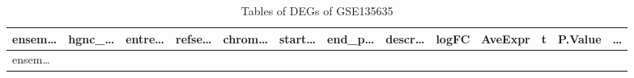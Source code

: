 \documentclass[
]{article}
\begin{document}
\begin{longtable}[]{@{}lllllllllllll@{}}
\caption{\label{tab:tables-of-DEGs-of-GSE135635}Tables of DEGs of GSE135635}\tabularnewline
\toprule
\begin{minipage}[b]{0.05\columnwidth}\raggedright
ensem\ldots{}\strut
\end{minipage} & \begin{minipage}[b]{0.05\columnwidth}\raggedright
hgnc\_\ldots{}\strut
\end{minipage} & \begin{minipage}[b]{0.05\columnwidth}\raggedright
entre\ldots{}\strut
\end{minipage} & \begin{minipage}[b]{0.05\columnwidth}\raggedright
refse\ldots{}\strut
\end{minipage} & \begin{minipage}[b]{0.05\columnwidth}\raggedright
chrom\ldots{}\strut
\end{minipage} & \begin{minipage}[b]{0.05\columnwidth}\raggedright
start\ldots{}\strut
\end{minipage} & \begin{minipage}[b]{0.05\columnwidth}\raggedright
end\_p\ldots{}\strut
\end{minipage} & \begin{minipage}[b]{0.05\columnwidth}\raggedright
descr\ldots{}\strut
\end{minipage} & \begin{minipage}[b]{0.05\columnwidth}\raggedright
logFC\strut
\end{minipage} & \begin{minipage}[b]{0.05\columnwidth}\raggedright
AveExpr\strut
\end{minipage} & \begin{minipage}[b]{0.05\columnwidth}\raggedright
t\strut
\end{minipage} & \begin{minipage}[b]{0.05\columnwidth}\raggedright
P.Value\strut
\end{minipage} & \begin{minipage}[b]{0.02\columnwidth}\raggedright
\ldots{}\strut
\end{minipage}\tabularnewline
\midrule
\endfirsthead
\toprule
\begin{minipage}[b]{0.05\columnwidth}\raggedright
ensem\ldots{}\strut
\end{minipage} & \begin{minipage}[b]{0.05\columnwidth}\raggedright

\end{minipage}
\end{longtable}
\end{document}
